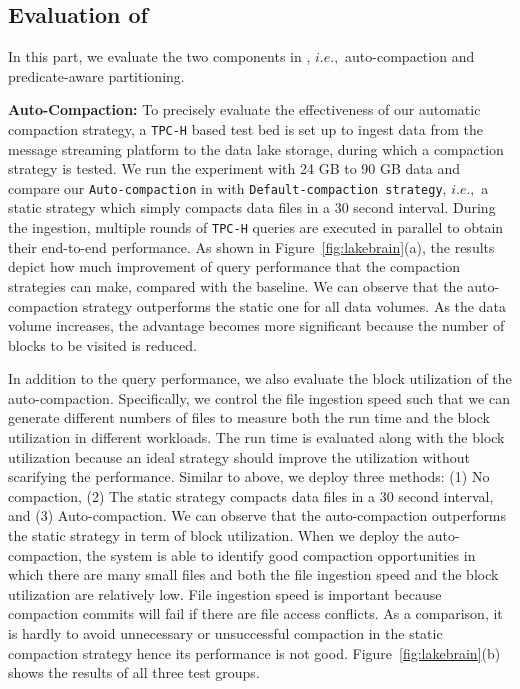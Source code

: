 \subsection{Evaluation of \brain}

In this part, we evaluate the two components in \brain, $i.e.,$ auto-compaction and predicate-aware partitioning.

 
\noindent \textbf{Auto-Compaction:} To precisely evaluate the effectiveness of our automatic compaction strategy, a \texttt{TPC-H} based test bed is set up to ingest data from the message streaming platform to the data lake storage, during which a compaction strategy is tested.
 We run the experiment with 24 GB to 90 GB data and compare our \texttt{Auto-compaction} in \sys with \texttt{Default-compaction strategy}, $i.e.,$ a static strategy which simply compacts data files in a 30 second interval. 
During the ingestion, multiple rounds of \texttt{TPC-H} queries are executed in parallel  to obtain their end-to-end performance. As shown in Figure~\ref{fig:lakebrain}(a), the results depict how much improvement of  query performance that the compaction strategies can make, compared with the baseline.
 We can observe that the auto-compaction strategy outperforms the static one for all data volumes. As the data volume increases, the advantage becomes more significant because the number of blocks to be visited is reduced.




In addition to the query performance, we also evaluate the block utilization of the auto-compaction. Specifically, we control the file ingestion speed such that we can generate different numbers of files to measure both the run time and the block utilization in different workloads. The run time is evaluated along with the block utilization because an ideal strategy should improve the utilization without scarifying the performance. Similar to above, we deploy three methods: (1) No compaction, (2) The static strategy compacts data files in a 30 second interval, and (3) Auto-compaction. We can observe that the auto-compaction outperforms the static strategy in term of block utilization.  When we deploy the auto-compaction, the system is able to identify good compaction opportunities in which there are many small files and both the file ingestion speed and the block utilization are relatively low. 
File ingestion speed is important because compaction commits will fail if there are file access conflicts. As a comparison, it is hardly to avoid unnecessary or unsuccessful compaction in the static compaction strategy hence its performance is not good. Figure~\ref{fig:lakebrain}(b) shows the results of all three test groups.






